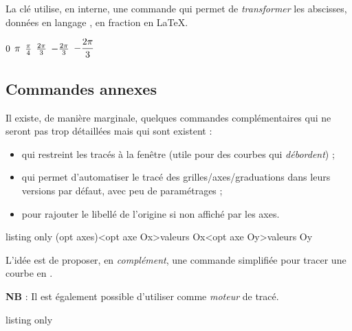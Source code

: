 \begin{noteblock}
La clé  utilise, en interne, une commande qui permet de \textit{transformer} les abscisses, données en langage \TikZ, en fraction en \LaTeX.
\end{noteblock}

\begin{PresCodePL}{}
$\AffAngleRadian{0}$ \quad $\AffAngleRadian{pi}$ \quad $\AffAngleRadian{pi/4}$ \quad 
$\AffAngleRadian{2*pi/3}$ \quad $\AffAngleRadian{-2*pi/3}$ \quad $\AffAngleRadian*{-2*pi/3}$
\end{PresCodePL}

\subsection{Commandes annexes}

\begin{noteblock}
Il existe, de manière marginale, quelques commandes complémentaires qui ne seront pas trop détaillées mais qui sont existent :

\begin{itemize}
	\item {} qui restreint les tracés à la fenêtre (utile pour des courbes qui \textit{débordent}) ;
	\item {} qui permet d'automatiser le tracé des grilles/axes/graduations dans leurs versions par défaut, avec peu de paramétrages ;
	\item {} pour rajouter le libellé de l'origine si non affiché par les axes.
\end{itemize}
\vspace*{-\baselineskip}\leavevmode
\end{noteblock}

\begin{PresCodeTexPL}{listing only}
	\FenetreTikz                %
	\FenetreSimpleTikz%
		[options](opt axes)<opt axe Ox>{valeurs Ox}<opt axe Oy>{valeurs Oy}
\end{PresCodeTexPL}

\begin{tipblock}
L'idée est de proposer, en \textit{complément}, une commande simplifiée pour tracer une courbe en \TikZ.

\textbf{NB} : Il est également possible d'utiliser  comme \textit{moteur} de tracé.
\end{tipblock}

\begin{PresCodeTexPL}{listing only}
\end{PresCodeTexPL}

